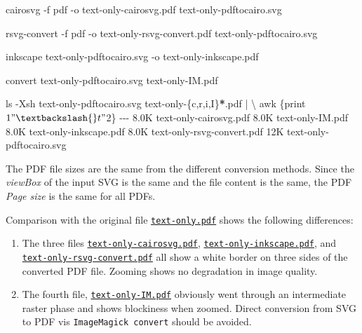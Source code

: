 \documentclass[
  a4paper,
]{article}
\newenvironment{Shaded}{\begin{snugshade}}{\end{snugshade}}
\newcommand{\AttributeTok}[1]{\textcolor[rgb]{0.80,0.80,0.80}{#1}}
\newcommand{\DataTypeTok}[1]{\textcolor[rgb]{0.87,0.87,0.75}{#1}}
\newcommand{\ExtensionTok}[1]{\textcolor[rgb]{0.80,0.80,0.80}{#1}}
\newcommand{\FunctionTok}[1]{\textcolor[rgb]{0.94,0.94,0.56}{#1}}
\newcommand{\KeywordTok}[1]{\textcolor[rgb]{0.94,0.87,0.69}{#1}}
\newcommand{\NormalTok}[1]{\textcolor[rgb]{0.80,0.80,0.80}{#1}}
\newcommand{\OperatorTok}[1]{\textcolor[rgb]{0.94,0.94,0.82}{#1}}
\newcommand{\PreprocessorTok}[1]{\textcolor[rgb]{1.00,0.81,0.69}{\textbf{#1}}}
\newcommand{\StringTok}[1]{\textcolor[rgb]{0.80,0.58,0.58}{#1}}
\begin{document}
\begin{Shaded}
\begin{Highlighting}[]
\ExtensionTok{cairosvg} \AttributeTok{{-}f}\NormalTok{ pdf }\AttributeTok{{-}o}\NormalTok{ text{-}only{-}cairosvg.pdf text{-}only{-}pdftocairo.svg}

\ExtensionTok{rsvg{-}convert} \AttributeTok{{-}f}\NormalTok{ pdf }\AttributeTok{{-}o}\NormalTok{ text{-}only{-}rsvg{-}convert.pdf text{-}only{-}pdftocairo.svg}

\ExtensionTok{inkscape}\NormalTok{ text{-}only{-}pdftocairo.svg }\AttributeTok{{-}o}\NormalTok{ text{-}only{-}inkscape.pdf}

\ExtensionTok{convert}\NormalTok{ text{-}only{-}pdftocairo.svg text{-}only{-}IM.pdf}

\FunctionTok{ls} \AttributeTok{{-}Xsh}\NormalTok{ text{-}only{-}pdftocairo.svg text{-}only{-}}\DataTypeTok{\{c}\OperatorTok{,}\DataTypeTok{r}\OperatorTok{,}\DataTypeTok{i}\OperatorTok{,}\DataTypeTok{I\}}\PreprocessorTok{*}\NormalTok{.pdf }\KeywordTok{|} \DataTypeTok{\textbackslash{}}
\FunctionTok{awk} \StringTok{\textquotesingle{}\{print $1 "\textbackslash{}t" $2\}\textquotesingle{}}
\ExtensionTok{{-}{-}{-}}
\ExtensionTok{8.0K}\NormalTok{    text{-}only{-}cairosvg.pdf}
\ExtensionTok{8.0K}\NormalTok{    text{-}only{-}IM.pdf}
\ExtensionTok{8.0K}\NormalTok{    text{-}only{-}inkscape.pdf}
\ExtensionTok{8.0K}\NormalTok{    text{-}only{-}rsvg{-}convert.pdf}
\ExtensionTok{12K}\NormalTok{     text{-}only{-}pdftocairo.svg}
\end{Highlighting}
\end{Shaded}

The PDF file sizes are the same from the different conversion methods.
Since the \emph{viewBox} of the input SVG is the same and the file
content is the same, the PDF \emph{Page size} is the same for all PDFs.

Comparison with the original file
\href{images/text-only.pdf}{\texttt{text-only.pdf}} shows the following
differences:

\begin{enumerate}
\def\labelenumi{\alph{enumi}.}
\item
  The three files \href{attach}{\texttt{text-only-cairosvg.pdf}},
  \href{images/text-only-inkscape.pdf}{\texttt{text-only-inkscape.pdf}},
  and
  \href{images/text-only-rsvg-convert.pdf}{\texttt{text-only-rsvg-convert.pdf}}
  all show a white border on three sides of the converted PDF file.
  Zooming shows no degradation in image quality.
\item
  The fourth file,
  \href{images/text-only-IM.pdf}{\texttt{text-only-IM.pdf}} obviously
  went through an intermediate raster phase and shows blockiness when
  zoomed. Direct conversion from SVG to PDF vis
  \texttt{ImageMagick\ convert} should be avoided.
\end{enumerate}
\end{document}
